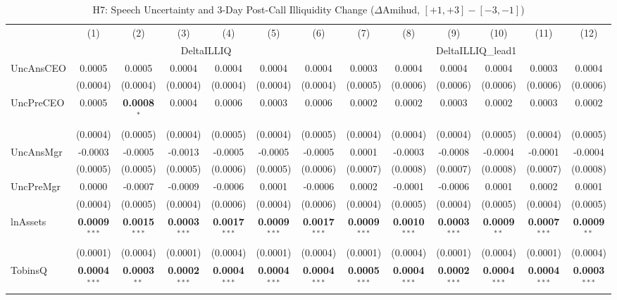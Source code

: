 \documentclass[11pt,a4paper]{article}
\begin{document}
\clearpage
\begin{table}[htbp]
\centering
\caption{H7: Speech Uncertainty and 3-Day Post-Call Illiquidity Change ($\Delta$Amihud, $[+1,+3]-[-3,-1]$)}
\label{tab:h7}
\scriptsize
\begin{tabular}{lcccccccccccc}
\toprule
 & (1) & (2) & (3) & (4) & (5) & (6) & (7) & (8) & (9) & (10) & (11) & (12) \\
 & \multicolumn{6}{c}{DeltaILLIQ} & \multicolumn{6}{c}{DeltaILLIQ\_lead1} \\
\cmidrule(lr){2-7} \cmidrule(lr){8-13}
\midrule
UncAnsCEO & 0.0005 & 0.0005 & 0.0004 & 0.0004 & 0.0004 & 0.0004 & 0.0003 & 0.0004 & 0.0004 & 0.0004 & 0.0003 & 0.0004 \\
 & (0.0004) & (0.0004) & (0.0004) & (0.0004) & (0.0004) & (0.0004) & (0.0005) & (0.0006) & (0.0006) & (0.0006) & (0.0006) & (0.0006) \\
UncPreCEO & 0.0005 & \textbf{0.0008}$^{*}$ & 0.0004 & 0.0006 & 0.0003 & 0.0006 & 0.0002 & 0.0002 & 0.0003 & 0.0002 & 0.0003 & 0.0002 \\
 & (0.0004) & (0.0005) & (0.0004) & (0.0005) & (0.0004) & (0.0005) & (0.0004) & (0.0004) & (0.0004) & (0.0005) & (0.0004) & (0.0005) \\
UncAnsMgr & -0.0003 & -0.0005 & -0.0013 & -0.0005 & -0.0005 & -0.0005 & 0.0001 & -0.0003 & -0.0008 & -0.0004 & -0.0001 & -0.0004 \\
 & (0.0005) & (0.0005) & (0.0005) & (0.0006) & (0.0005) & (0.0006) & (0.0007) & (0.0008) & (0.0007) & (0.0008) & (0.0007) & (0.0008) \\
UncPreMgr & 0.0000 & -0.0007 & -0.0009 & -0.0006 & 0.0001 & -0.0006 & 0.0002 & -0.0001 & -0.0006 & 0.0001 & 0.0002 & 0.0001 \\
 & (0.0004) & (0.0005) & (0.0004) & (0.0006) & (0.0004) & (0.0006) & (0.0004) & (0.0005) & (0.0004) & (0.0005) & (0.0004) & (0.0005) \\
\midrule
lnAssets & \textbf{0.0009}$^{***}$ & \textbf{0.0015}$^{***}$ & \textbf{0.0003}$^{***}$ & \textbf{0.0017}$^{***}$ & \textbf{0.0009}$^{***}$ & \textbf{0.0017}$^{***}$ & \textbf{0.0009}$^{***}$ & \textbf{0.0010}$^{***}$ & \textbf{0.0003}$^{***}$ & \textbf{0.0009}$^{**}$ & \textbf{0.0007}$^{***}$ & \textbf{0.0009}$^{**}$ \\
 & (0.0001) & (0.0004) & (0.0001) & (0.0004) & (0.0001) & (0.0004) & (0.0001) & (0.0004) & (0.0001) & (0.0004) & (0.0001) & (0.0004) \\
TobinsQ & \textbf{0.0004}$^{***}$ & \textbf{0.0003}$^{**}$ & \textbf{0.0002}$^{***}$ & \textbf{0.0004}$^{***}$ & \textbf{0.0004}$^{***}$ & \textbf{0.0004}$^{***}$ & \textbf{0.0005}$^{***}$ & \textbf{0.0004}$^{***}$ & \textbf{0.0002}$^{***}$ & \textbf{0.0004}$^{***}$ & \textbf{0.0004}$^{***}$ & \textbf{0.0003}$^{***}$ \\

\end{tabular}
\end{table}
\end{document}
